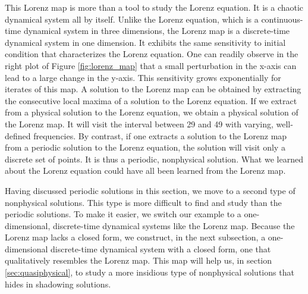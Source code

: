 This Lorenz map is more than a tool to study the Lorenz equation.  It is a chaotic
dynamical system all by itself. Unlike the Lorenz equation, which is a continuous-time
dynamical system in three dimensions, the Lorenz map is a discrete-time dynamical
system in one dimension.  It exhibits the same sensitivity to initial condition
that characterizes the Lorenz equation.  One can readily observe in the right
plot of Figure \ref{fig:lorenz_map} that a small perturbation in the x-axis
can lead to a large change in the y-axis. This sensitivity grows exponentially
for iterates of this map. A solution to the Lorenz map can be obtained
by extracting the consecutive local maxima of a solution to the Lorenz equation.
If we extract from a physical solution to the Lorenz equation, we obtain a physical solution of the Lorenz map.  It will visit the
interval between 29 and 49 with varying, well-defined frequencies.
By contrast, if one extracts a solution to the Lorenz map from a periodic solution
to the Lorenz equation, the solution will visit only a discrete set of points.
It is thus a periodic, nonphysical solution.  What we learned about
the Lorenz equation could have all been learned from the Lorenz map.

Having discussed periodic solutions in this section,
we move to a second type of nonphysical solutions.
This type is more difficult to find and study than the periodic solutions.
To make it easier, we switch our example to a one-dimensional, 
discrete-time dynamical
systems like the Lorenz map.  Because the Lorenz map lacks a closed form,
we construct, in the next subsection, a one-dimensional discrete-time dynamical system
with a closed form, one that qualitatively resembles the Lorenz map.  This map
will help us, in section \ref{sec:quasiphysical}, to study a more insidious type
of nonphysical solutions that hides in shadowing solutions.

